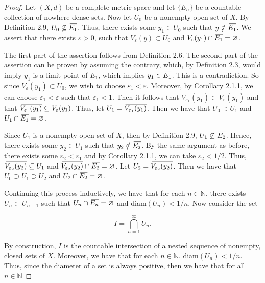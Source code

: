 \documentclass{article}
\theoremstyle{definition}
\theoremstyle{remark}
\newcommand{\closure}[2][3]{%
  {}\mkern#1mu\overline{\mkern-#1mu#2}}
\theoremstyle{definition}
\begin{document}
\begin{proof}
    Let $(X,d)$ be a complete metric space and let $\{E_n\}$ be a countable collection of nowhere-dense sets. Now let $U_0$ be a nonempty open set of $X$. By Definition 2.9, $U_0\not\subseteq \closure{E_1}$. Thus, there exists some $y_1\in U_0$ such that $y\notin \closure{E_1}$. We assert that there exists $\varepsilon>0$, such that $V_{\varepsilon}(y)\subset U_0$ and $V_{\varepsilon}(y_1)\cap\closure{E_1}=\varnothing$.\par The first part of the assertion follows from Definition 2.6. The second part of the assertion can be proven by assuming the contrary, which, by Definition 2.3, would imply $y_1$ is a limit point of $E_1$, which implies $y_1\in\closure{E_1}$. This is a contradiction. So since $V_{\varepsilon}(y_1)\subset U_0$,  we wish to choose $\varepsilon_1<\varepsilon$. Moreover, by Corollary 2.1.1, we can choose $\varepsilon_1<\varepsilon$ such that $\varepsilon_1<1$. Then it follows that $V_{\varepsilon_1}(y_1)\subset V_{\varepsilon}(y_1)$ and that $\closure{V_{\varepsilon_1}(y_1)}\subseteq V_{\varepsilon}(y_1)$. Thus, let $U_1=\closure{V_{\varepsilon_1}(y_1)}$. Then we have that $U_0\supset U_1$ and $U_1\cap\closure{E_1}=\varnothing$.\par
    
    Since $U_1$ is a nonempty open set of $X$, then by Definition 2.9, $U_1\not\subseteq\closure{E_2}$. Hence, there exists some $y_2\in U_1$ such that $y_2\notin\closure{E_2}$. By the same argument as before, there exists some $\varepsilon_2<\varepsilon_1$ and by Corollary 2.1.1, we can take $\varepsilon_2<1/2$. Thus, $\closure{V_{\varepsilon_2}(y_2)}\subseteq U_1$ and $\closure{V_{\varepsilon_2}(y_2)}\cap\closure{E_2}=\varnothing$. Let $U_2=\closure{V_{\varepsilon_2}(y_2)}$. Then we have that $U_0\supset U_1\supset U_2$ and $U_2\cap\closure{E_2}=\varnothing$.\par
    
    Continuing this process inductively, we have that for each $n\in\mathbb{N}$, there exists $U_n\subset U_{n-1}$ such that $U_n\cap\closure{E_n}=\varnothing$ and diam$(U_n)<1/n$. Now consider the set
    
    \begin{equation*}
        I=\bigcap_{n=1}^{\infty} U_n.
    \end{equation*}
    
    \noindent By construction, $I$ is the countable intersection of a nested sequence of nonempty, closed sets of $X$. Moreover, we have that for each $n\in\mathbb{N}$, diam$(U_n)<1/n$. Thus, since the diameter of a set is always positive, then we have that for all $n\in\mathbb{N}$
    

\end{proof}
\end{document}
